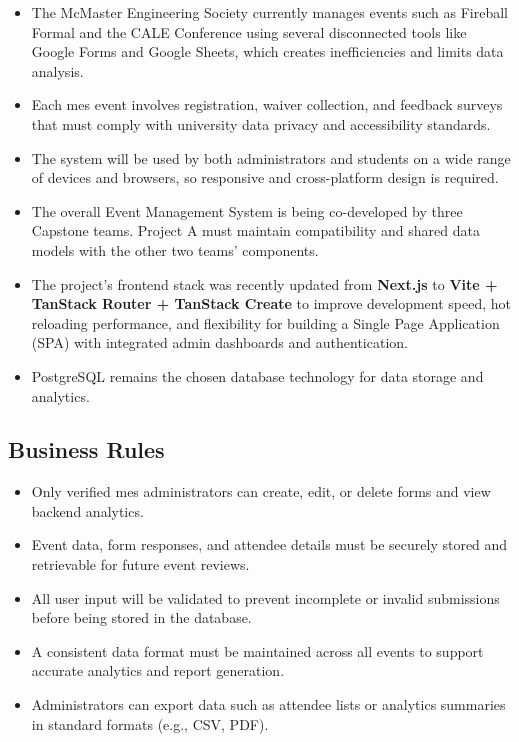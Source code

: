 \documentclass[12pt]{article}
\begin{document}
\begin{itemize}
    \item The McMaster Engineering Society currently manages events such as Fireball Formal and the CALE Conference
      using several disconnected tools like Google Forms and Google Sheets, which creates inefficiencies and limits data
      analysis.
    \item Each \gls{mes} event involves registration, waiver collection, and feedback surveys that must comply with
      university data privacy and accessibility standards.
    \item The system will be used by both administrators and students on a wide range of devices and browsers, so
      responsive and cross-platform design is required.
    \item The overall Event Management System is being co-developed by three Capstone teams. Project A must maintain
      compatibility and shared data models with the other two teams’ components.
    \item The project’s frontend stack was recently updated from \textbf{Next.js} to \textbf{Vite + TanStack Router +
      TanStack Create} to improve development speed, hot reloading performance, and flexibility for building a Single
      Page Application (SPA) with integrated admin dashboards and authentication.
    \item PostgreSQL remains the chosen database technology for data storage and analytics.
\end{itemize}

\subsection{Business Rules}

\begin{itemize}
    \item Only verified \gls{mes} administrators can create, edit, or delete forms and view backend analytics.
    \item Event data, form responses, and attendee details must be securely stored and retrievable for future event
      reviews.
    \item All user input will be validated to prevent incomplete or invalid submissions before being stored in the
      database.
    \item A consistent data format must be maintained across all events to support accurate analytics and report
      generation.
    \item Administrators can export data such as attendee lists or analytics summaries in standard formats (e.g., CSV,
      PDF).
\end{itemize}
\end{document}
